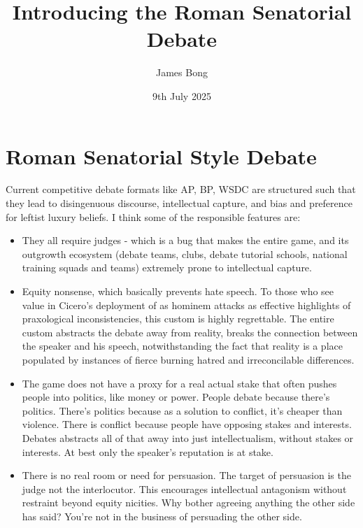 \documentclass[9pt]{article}
\title{Introducing the Roman Senatorial Debate}
\author{James Bong}
\date{9th July 2025}
\begin{document}
\sloppy

\jcz{}

\maketitle

\section{Roman Senatorial Style Debate}

Current competitive debate formats like AP, BP, WSDC are structured such that they lead to disingenuous discourse, intellectual capture, and bias and preference for leftist luxury beliefs. I think some of the responsible features are:

\begin{itemize}
    \item They all require judges - which is a bug that makes the entire game, and its outgrowth ecosystem (debate teams, clubs, debate tutorial schools, national training squads and teams) extremely prone to intellectual capture.
    \item Equity nonsense, which basically prevents hate speech. To those who see value in Cicero's deployment of as hominem attacks as effective highlights of praxological inconsistencies, this custom is highly regrettable. The entire custom abstracts the debate away from reality, breaks the connection between the speaker and his speech, notwithstanding the fact that reality is a place populated by instances of fierce burning hatred and irreconcilable differences.
    \item The game does not have a proxy for a real actual stake that often pushes people into politics, like money or power. People debate because there's politics. There's politics because as a solution to conflict, it's cheaper than violence. There is conflict because people have opposing stakes and interests. Debates abstracts all of that away into just intellectualism, without stakes or interests. At best only the speaker's reputation is at stake.
    \item There is no real room or need for persuasion. The target of persuasion is the judge not the interlocutor. This encourages intellectual antagonism without restraint beyond equity nicities. Why bother agreeing anything the other side has said? You're not in the business of persuading the other side.
\end{itemize}
\end{document}
